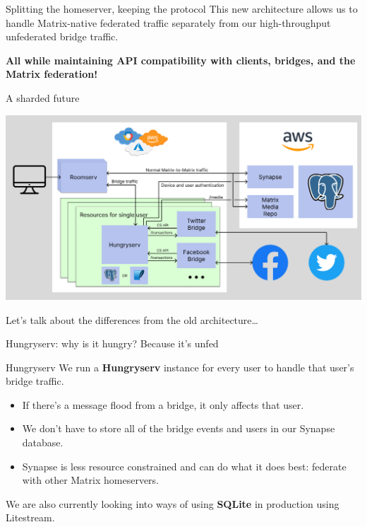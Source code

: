 \documentclass{beeper}
\begin{document}
\begin{frame}{Splitting the homeserver, keeping the protocol}
    \Large
    \centering
    This new architecture allows us to handle Matrix-native federated traffic
    separately from our high-throughput unfederated bridge traffic.
    \pause

    \textbf{All while maintaining API compatibility with clients, bridges, and
    the Matrix federation!}
\end{frame}

\begin{frame}{A sharded future}
    \centerline{\includegraphics[width=1.15\textwidth]{images/new-architecture}}

    Let's talk about the differences from the old architecture\ldots
\end{frame}

\begin{frame}{Hungryserv: why is it hungry?}
    \Large
    Because it's unfed
\end{frame}

\begin{frame}{Hungryserv}
    We run a \textbf{Hungryserv} instance for every user to handle that user's
    bridge traffic.
    \pause

    \begin{itemize}[<+->]
        \item If there's a message flood from a bridge, it only affects that
            user.
        \item We don't have to store all of the bridge events and users in our
            Synapse database.
        \item Synapse is less resource constrained and can do what it does best:
            federate with other Matrix homeservers.
    \end{itemize}
    \pause[\thebeamerpauses]

    We are also currently looking into ways of using \textbf{SQLite} in
    production using Litestream.
\end{frame}
\end{document}
